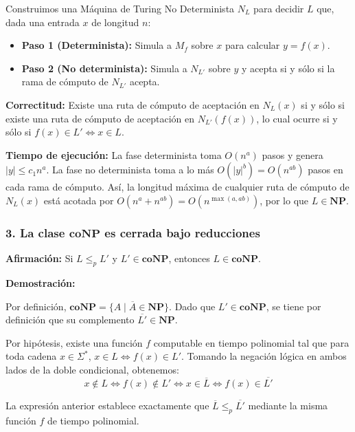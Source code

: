 Construimos una Máquina de Turing No Determinista $N_L$ para decidir $L$ que, dada una entrada $x$ de longitud $n$:
\begin{itemize}[leftmargin=*]
    \item \textbf{Paso 1 (Determinista):} Simula a $M_f$ sobre $x$ para calcular $y = f(x)$.
    \item \textbf{Paso 2 (No determinista):} Simula a $N_{L'}$ sobre $y$ y acepta si y sólo si la rama de cómputo de $N_{L'}$ acepta.
\end{itemize}

\noindent\textbf{Correctitud:} Existe una ruta de cómputo de aceptación en $N_L(x)$ si y sólo si existe una ruta de cómputo de aceptación en $N_{L'}(f(x))$, lo cual ocurre si y sólo si $f(x) \in L' \iff x \in L$.

\vspace{0.2cm}
\noindent\textbf{Tiempo de ejecución:} La fase determinista toma $O(n^a)$ pasos y genera $|y| \le c_1 n^a$. La fase no determinista toma a lo más $O(|y|^b) = O(n^{ab})$ pasos en cada rama de cómputo. Así, la longitud máxima de cualquier ruta de cómputo de $N_L(x)$ está acotada por $O(n^a + n^{ab}) = O(n^{\max(a, ab)})$, por lo que \textbf{$L \in \mathbf{NP}$}. 

\subsubsection*{3. La clase $\mathbf{coNP}$ es cerrada bajo reducciones}

\noindent\textbf{Afirmación:} Si $L \le_p L'$ y $L' \in \mathbf{coNP}$, entonces $L \in \mathbf{coNP}$.

\vspace{0.2cm}
\noindent\textbf{Demostración:}

Por definición, $\mathbf{coNP} = \{ A \mid \overline{A} \in \mathbf{NP} \}$. Dado que $L' \in \mathbf{coNP}$, se tiene por definición que su complemento $\overline{L'} \in \mathbf{NP}$.

Por hipótesis, existe una función $f$ computable en tiempo polinomial tal que para toda cadena $x \in \Sigma^*$, $x \in L \iff f(x) \in L'$. Tomando la negación lógica en ambos lados de la doble condicional, obtenemos:
\[ x \notin L \iff f(x) \notin L' \iff x \in \overline{L} \iff f(x) \in \overline{L'} \]

La expresión anterior establece exactamente que $\overline{L} \le_p \overline{L'}$ mediante la misma función $f$ de tiempo polinomial.

